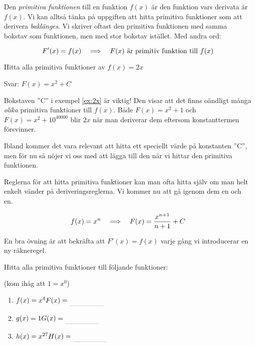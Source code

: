 \documentclass[a4paper,12pt]{article}
\begin{document}
Den \emph{primitiva funktionen} till en funktion $f(x)$ är den funktion vars derivata är $f(x)$. Vi kan alltså tänka på uppgiften att hitta primitiva funktioner som att derivera \emph{baklänges}. Vi skriver oftast den primitiva funktionen med samma bokstav som funktionen, men med stor bokstav istället. Med andra ord:

\[F'(x) = f(x) \hspace{1em} \Longrightarrow \hspace{1em} F(x) \textrm{ är primitiv funktion till } f(x)\]


\begin{exempel}
    \label{ex:2x}
    Hitta alla primitiva funktioner av $f(x) = 2x$

    Svar: $F(x) = x^2 + C$
\end{exempel}

Bokstaven ''C'' i exempel \ref{ex:2x} är viktig! Den visar att det finns oändligt många \emph{olika} primitiva funktioner till $f(x)$. Både $F(x) = x^2 + 1$ och $F(x) = x^2 + 10^{40000}$ blir $2x$ när man deriverar dem eftersom konstanttermen försvinner.

Ibland kommer det vara relevant att hitta ett speciellt värde på konstanten ''C'', men för nu så nöjer vi oss med att lägga till den när vi hittar den primitiva funktionen.

Reglerna för att hitta primitiva funktioner kan man ofta hitta själv om man helt enkelt vänder på deriveringsreglerna. Vi kommer nu att gå igenom dem en och en.


\begin{regel}
    \[f(x) = x^n \hspace{1em} \Longrightarrow \hspace{1em} F(x) = \dfrac {x^{n+1}}{n+1} + C\]
\end{regel}

En bra övning är att bekräfta att $F'(x) = f(x)$ varje gång vi introducerar en ny räkneregel.

\begin{uppgifter}
    \label{upp:x^n}
    Hitta alla primitiva funktioner till följande funktioner: 
    
    (kom ihåg att $1=x^0$)
    \begin{multicols}{3}
        \begin{enumerate}
            \item $f(x) = x^4 \\ F(x) \ans$
            \item $g(x) = 1 \\ G(x) \ans$
            \item $h(x) = x^{27} \\ H(x) \ans$
        \end{enumerate}
    \end{multicols}
\end{uppgifter}
\end{document}
